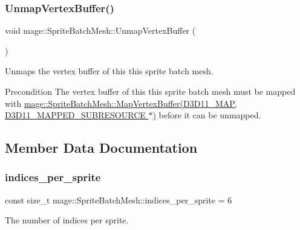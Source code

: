 \subsubsection{\texorpdfstring{Unmap\+Vertex\+Buffer()}{UnmapVertexBuffer()}}
{\footnotesize\ttfamily void mage\+::\+Sprite\+Batch\+Mesh\+::\+Unmap\+Vertex\+Buffer (\begin{DoxyParamCaption}{ }\end{DoxyParamCaption})}

Unmaps the vertex buffer of this this sprite batch mesh.

\begin{DoxyPrecond}{Precondition}
The vertex buffer of this this sprite batch mesh must be mapped with \hyperlink{classmage_1_1_sprite_batch_mesh_ab790dbbd3cb685c1f14d7ca1e9ed639b}{mage\+::\+Sprite\+Batch\+Mesh\+::\+Map\+Vertex\+Buffer(\+D3\+D11\+\_\+\+M\+A\+P, D3\+D11\+\_\+\+M\+A\+P\+P\+E\+D\+\_\+\+S\+U\+B\+R\+E\+S\+O\+U\+R\+C\+E $\ast$)} before it can be unmapped. 
\end{DoxyPrecond}


\subsection{Member Data Documentation}
\hypertarget{classmage_1_1_sprite_batch_mesh_aeac9ce4a3a16f212a5bb29f89038110b}{}\label{classmage_1_1_sprite_batch_mesh_aeac9ce4a3a16f212a5bb29f89038110b} 
\subsubsection{\texorpdfstring{indices\+\_\+per\+\_\+sprite}{indices\_per\_sprite}}
{\footnotesize\ttfamily const size\+\_\+t mage\+::\+Sprite\+Batch\+Mesh\+::indices\+\_\+per\+\_\+sprite = 6\hspace{0.3cm}{\ttfamily [static]}}

The number of indices per sprite. \hypertarget{classmage_1_1_sprite_batch_mesh_a562657a44b2b155e8d5496bfe8101ba2}{}\label{classmage_1_1_sprite_batch_mesh_a562657a44b2b155e8d5496bfe8101ba2} 
